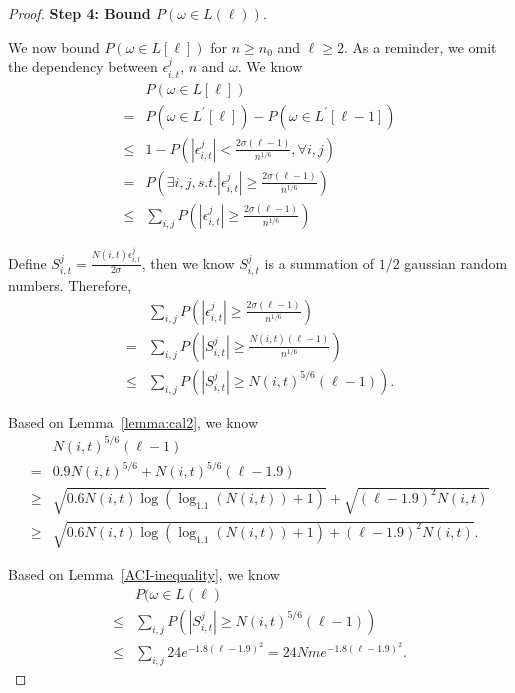 \begin{proof}
\noindent\textbf{Step 4: Bound $P(\omega\in L(\ell))$}.

We now bound $P(\omega\in L[\ell])$ for $n\geq n_0$ and $\ell\geq 2$. As a reminder, we omit the dependency between $\epsilon_{i,t}^{j}$, $n$ and $\omega$. We know 
\begin{align}
&P(\omega\in L[\ell]) \nonumber \\
=&P(\omega\in L^{'}[\ell])- P(\omega\in L^{'}[\ell-1]) \nonumber \\
\leq & 1-P\left(|\epsilon_{i,t}^{j}|<\frac{2\sigma (\ell-1)}{n^{1/6}}, \forall i,j\right) \nonumber \\
=&P\left(\exists i,j, s.t. |\epsilon_{i,t}^{j}|\geq \frac{2\sigma (\ell-1)}{n^{1/6}}\right) \nonumber  \\
\leq &\sum_{i,j}P\left(|\epsilon_{i,t}^{j}|\geq \frac{2\sigma (\ell-1)}{n^{1/6}}\right) \nonumber
\end{align}

Define $S_{i,t}^{j}=\frac{N(i,t)\epsilon_{i,t}^{j}}{2\sigma}$, then we know $S_{i,t}^{j}$ is a summation of $1/2$ gaussian random numbers. Therefore,
\begin{align}
&\sum_{i,j}P\left(|\epsilon_{i,t}^{j}|\geq \frac{2\sigma(\ell-1)}{n^{1/6}}\right) \nonumber \\ 
=&\sum_{i,j}P\left(|S_{i,t}^{j}|\geq \frac{N(i,t)(\ell-1)}{n^{1/6}}\right) \nonumber \\
\leq &\sum_{i,j}P(|S_{i,t}^{j}|\geq N(i,t)^{5/6}(\ell-1)). \nonumber
\end{align}

Based on Lemma~\ref{lemma:cal2}, we know
\begin{align}
&N(i,t)^{5/6}(\ell-1) \nonumber \\
=& 0.9N(i,t)^{5/6} + N(i,t)^{5/6}(\ell-1.9) \nonumber \\
\geq & \sqrt{0.6N(i,t)\log(\log_{1.1}(N(i,t))+1)} + \sqrt{(\ell-1.9)^2 N(i,t)} \nonumber \\
\geq & \sqrt{0.6N(i,t)\log(\log_{1.1}(N(i,t))+1)+(\ell-1.9)^2 N(i,t)}. \nonumber
\end{align}

Based on Lemma~\ref{ACI-inequality}, we know
\begin{align}
& P(\omega\in L(\ell) \nonumber \\
\leq &\sum_{i,j}P(|S_{i,t}^{j}|\geq N(i,t)^{5/6}(\ell-1)) \nonumber \\
\leq & \sum_{i,j}24e^{-1.8(\ell-1.9)^2} = 24Nme^{-1.8(\ell-1.9)^2}. \nonumber
\end{align}


\end{proof}
